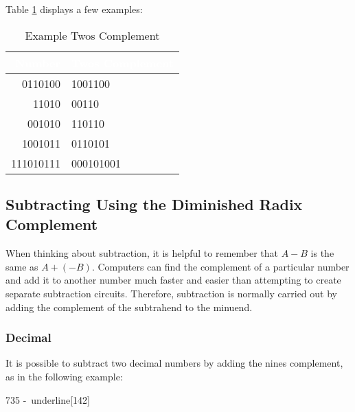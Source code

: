 Table \ref{MO:tab:example_twos_comp} displays a few examples:

\begin{table}[H]
  \sffamily
  \newcommand{\head}[1]{\textcolor{white}{\textbf{#1}}}    
  \begin{center}
    \begin{tabular}{ r l } 
      \hline
      \rowcolor{black!75}
      {\head{Number}} & {\head{Twos Complement}} \\
      \hline
      0110100   & 1001100   \\
      11010     & 00110     \\
      001010    & 110110    \\
      1001011   & 0110101   \\
      111010111 & 000101001 \\
      \hline
    \end{tabular}
  \end{center}
  \caption{Example Twos Complement}
  \label{MO:tab:example_twos_comp}
\end{table} 

\subsection{Subtracting Using the Diminished Radix Complement }
\label{MO:sub:subtracting_using_diminished_radix}

When thinking about subtraction, it is helpful to remember that $ A - B $ is the same as $ A + (-B) $. Computers can find the complement of a particular number and add it to another number much faster and easier than attempting to create separate subtraction circuits. Therefore, subtraction is normally carried out by adding the complement of the subtrahend to the minuend.

\subsubsection{Decimal}
\label{MO:subsub:decimal_subtraction_with_diminished_radix}

 It is possible to subtract two decimal numbers by adding the nines complement, as in the following example:

\begin{binDisp}[commandchars=~\[\]]
      735
     -~underline[142]
\end{binDisp}

